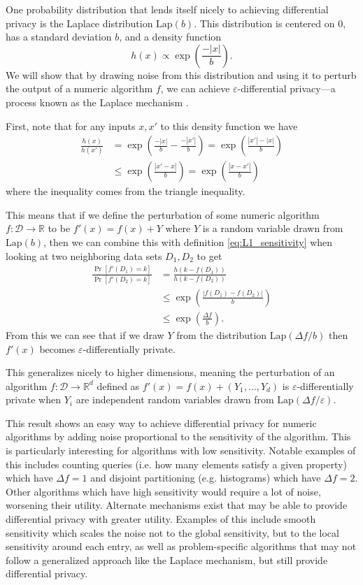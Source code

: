 \documentclass[12pt]{article}
\newcommand{\fancy}{\mathcal}
\renewcommand{\epsilon}{\varepsilon}
\begin{document}
One probability distribution that lends itself nicely to achieving differential privacy is the Laplace distribution $\text{Lap}(b)$. This distribution is centered on 0, has a standard deviation $b$, and a density function
\begin{equation*}
    h(x)\propto \exp\left(\frac{-|x|}{b}\right).
\end{equation*}
We will show that by drawing noise from this distribution and using it to perturb the output of a numeric algorithm $f$, we can achieve $\epsilon$-differential privacy---a process known as the Laplace mechanism \cite{dworketal2006}. \bigskip

First, note that for any inputs $x,x'$ to this density function we have
\begin{align*}
    \frac{h(x)}{h(x')} &= \exp\left(\frac{-|x|}{b}-\frac{-|x'|}{b}\right) = \exp\left(\frac{|x'|-|x|}{b} \right) \\
        &\leq \exp\left( \frac{|x'-x|}{b} \right) = \exp\left( \frac{|x-x'|}{b} \right)
\end{align*}
where the inequality comes from the triangle inequality.

This means that if we define the perturbation of some numeric algorithm $f: \fancy{D} \to \mathbb{R}$ to be $f'(x) = f(x)+Y$ where $Y$ is a random variable drawn from $\text{Lap}(b)$, then we can combine this with definition \ref{eq:L1_sensitivity} when looking at two neighboring data sets $D_1,D_2$ to get
\begin{align*}
    \frac{\Pr[f'(D_1)=k]}{\Pr[f'(D_2)=k]} &= \frac{h(k - f(D_1))}{h(k - f(D_2))} \\
        &\leq \exp\left( \frac{|f(D_1)-f(D_2)|}{b}\right) \\
        &\leq \exp\left(\frac{\Delta f}{b}\right).
\end{align*}
From this we can see that if we draw $Y$ from the distribution $\text{Lap}(\Delta f/b)$ then $f'(x)$ becomes $\epsilon$-differentially private.

This generalizes nicely to higher dimensions, meaning the perturbation of an algorithm $f : \fancy{D} \to \mathbb{R}^d$ defined as $f'(x) = f(x) + (Y_1,\dots,Y_d)$ is $\epsilon$-differentially private when $Y_i$ are independent random variables drawn from $\text{Lap}(\Delta f / \epsilon)$. \bigskip

This result shows an easy way to achieve differential privacy for numeric algorithms by adding noise proportional to the sensitivity of the algorithm. This is particularly interesting for algorithms with low sensitivity. Notable examples of this includes counting queries (i.e. how many elements satisfy a given property) which have $\Delta f=1$ and disjoint partitioning (e.g. histograms) which have $\Delta f=2$. Other algorithms which have high sensitivity would require a lot of noise, worsening their utility. Alternate mechanisms exist that may be able to provide differential privacy with greater utility. Examples of this include smooth sensitivity \cite{nissim_smoothsens} which scales the noise not to the global sensitivity, but to the local sensitivity around each entry, as well as problem-specific algorithms that may not follow a generalized approach like the Laplace mechanism, but still provide differential privacy.
\end{document}
